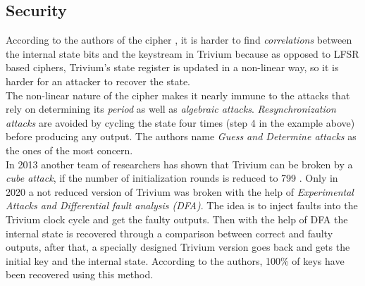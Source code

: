 	\subsection{Security}
	According to the authors of the cipher \cite{canniere2008trivium}, it is harder to find \emph{correlations} between the internal state bits and the keystream in Trivium because as opposed to LFSR based ciphers, Trivium's state register is updated in a non-linear way, so it is harder for an attacker to recover the state.\\
	The non-linear nature of the cipher makes it nearly immune to the attacks that rely on determining its \emph{period} as well as \emph{algebraic attacks}. \emph{Resynchronization attacks} are avoided by cycling the state four times (step 4 in the example above) before producing any output. The authors name \emph{Guess and Determine attacks} as the ones of the most concern.\\
	In 2013 another team of researchers has shown that Trivium can be broken by a \emph{cube attack}, if the number of initialization rounds is reduced to 799 \cite{fouque2013improving}. 
	Only in 2020 \cite{potestad2020breaking} a not reduced version of Trivium was broken with the help of \emph{Experimental Attacks and Differential fault analysis (DFA)}. The idea is to inject faults into the Trivium clock cycle and get the faulty outputs. Then with the help of DFA the internal state is recovered through a comparison between correct and faulty outputs, after that, a specially designed Trivium version goes back and gets the initial key and the internal state. According to the authors, 100\% of keys have been recovered using this method.
	
